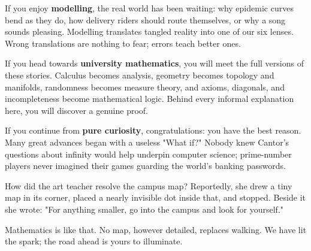 If you enjoy \textbf{modelling}, the real world has been waiting: why epidemic curves bend as they do, how delivery riders should route themselves, or why a song sounds pleasing. Modelling translates tangled reality into one of our six lenses. Wrong translations are nothing to fear; errors teach better ones.

If you head towards \textbf{university mathematics}, you will meet the full versions of these stories. Calculus becomes analysis, geometry becomes topology and manifolds, randomness becomes measure theory, and axioms, diagonals, and incompleteness become mathematical logic. Behind every informal explanation here, you will discover a genuine proof.

If you continue from \textbf{pure curiosity}, congratulations: you have the best reason. Many great advances began with a useless "What if?" Nobody knew Cantor's questions about infinity would help underpin computer science; prime-number players never imagined their games guarding the world's banking passwords.

How did the art teacher resolve the campus map? Reportedly, she drew a tiny map in its corner, placed a nearly invisible dot inside that, and stopped. Beside it she wrote: "For anything smaller, go into the campus and look for yourself."

Mathematics is like that. No map, however detailed, replaces walking. We have lit the spark; the road ahead is yours to illuminate.
